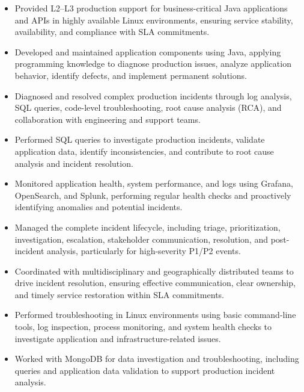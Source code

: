 \documentclass[10pt,letterpaper]{article}
\begin{document}
\begin{itemize}

    \item Provided L2--L3 production support for business-critical Java applications and APIs in highly available Linux environments, ensuring service stability, availability, and compliance with SLA commitments.

    \item Developed and maintained application components using Java, applying programming knowledge to diagnose production issues, analyze application behavior, identify defects, and implement permanent solutions.

    \item Diagnosed and resolved complex production incidents through log analysis, SQL queries, code-level troubleshooting, root cause analysis (RCA), and collaboration with engineering and support teams.

    \item Performed SQL queries to investigate production incidents, validate application data, identify inconsistencies, and contribute to root cause analysis and incident resolution.

    \item Monitored application health, system performance, and logs using Grafana, OpenSearch, and Splunk, performing regular health checks and proactively identifying anomalies and potential incidents.

    \item Managed the complete incident lifecycle, including triage, prioritization, investigation, escalation, stakeholder communication, resolution, and post-incident analysis, particularly for high-severity P1/P2 events.

    \item Coordinated with multidisciplinary and geographically distributed teams to drive incident resolution, ensuring effective communication, clear ownership, and timely service restoration within SLA commitments.

    \item Performed troubleshooting in Linux environments using basic command-line tools, log inspection, process monitoring, and system health checks to investigate application and infrastructure-related issues.

    \item Worked with MongoDB for data investigation and troubleshooting, including queries and application data validation to support production incident analysis.


\end{itemize}
\end{document}
